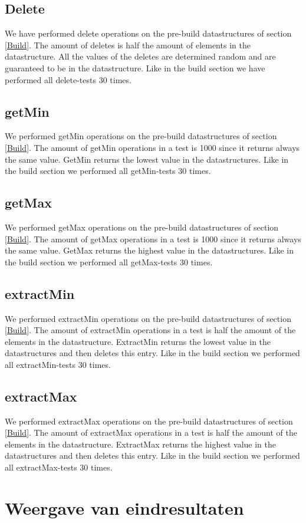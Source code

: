 \documentclass{article}
\begin{document}
\subsection{Delete}
We have performed delete operations on the pre-build datastructures of section \ref{Build}. The amount of deletes is half the amount of elements in the datastructure. All the values of the deletes are determined random and are guaranteed to be in the datastructure. Like in the build section we have performed all delete-tests 30 times.
\subsection{getMin}
We performed getMin operations on the pre-build datastructures of section \ref{Build}. The amount of getMin operations in a test is 1000 since it returns always the same value. GetMin returns the lowest value in the datastructures. Like in the build section we performed all getMin-tests 30 times.
\label{getMin}
\subsection{getMax}
We performed getMax operations on the pre-build datastructures of section \ref{Build}. The amount of getMax operations in a test is 1000 since it returns always the same value. GetMax returns the highest value in the datastructures. Like in the build section we performed all getMax-tests 30 times.
\label{getMax}
\subsection{extractMin}
We performed extractMin operations on the pre-build datastructures of section \ref{Build}. The amount of extractMin operations in a test is half the amount of the elements in the datastructure. ExtractMin returns the lowest value in the datastructures and then deletes this entry. Like in the build section we performed all extractMin-tests 30 times.
\subsection{extractMax}
We performed extractMax operations on the pre-build datastructures of section \ref{Build}. The amount of extractMax operations in a test is half the amount of the elements in the datastructure. ExtractMax returns the highest value in the datastructures and then deletes this entry. Like in the build section we performed all extractMax-tests 30 times.
\section{Weergave van eindresultaten}
\end{document}
